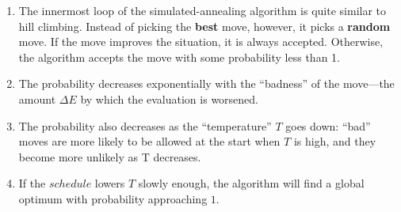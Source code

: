\begin{enumerate}
    \item The innermost loop of the simulated-annealing algorithm is quite similar to hill climbing. 
    Instead of picking the \textbf{best} move, however, it picks a \textbf{random} move. 
    If the move improves the situation, it is always accepted. 
    Otherwise, the algorithm accepts the move with some probability less than 1.
    \hfill \cite{ai/book/Artificial-Intelligence-A-Modern-Approach/Russell-Norvig}

    \item The probability decreases exponentially with the “badness” of the move—the amount $\Delta E$ by which the evaluation is worsened.
    \hfill \cite{ai/book/Artificial-Intelligence-A-Modern-Approach/Russell-Norvig}

    \item The probability also decreases as the “temperature” $T$ goes down: “bad” moves are more likely to be allowed at the start when $T$ is high, and they become more unlikely as T decreases. 
    \hfill \cite{ai/book/Artificial-Intelligence-A-Modern-Approach/Russell-Norvig}
    
    \item If the $schedule$ lowers $T$ slowly enough, the algorithm will find a global optimum with probability approaching $1$.
    \hfill \cite{ai/book/Artificial-Intelligence-A-Modern-Approach/Russell-Norvig}
\end{enumerate}












